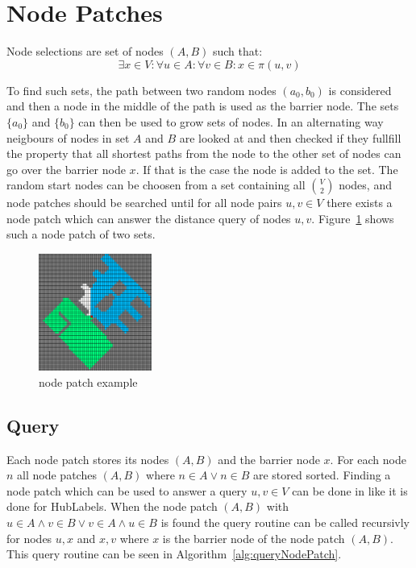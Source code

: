\documentclass{article}
\begin{document}
\section{Node Patches}
Node selections are set of nodes $(A, B)$ such that:
\begin{equation*}
  \exists x \in V: \forall u \in A: \forall v \in B: x \in \pi(u, v)
\end{equation*}

To find such sets, the path between two random nodes $(a_0, b_0)$ is considered and then a node in the middle of the path is used as the barrier node.
The sets $\{a_0\}$ and $\{b_0\}$ can then be used to grow sets of nodes. In an alternating way neigbours of nodes in set $A$ and $B$ are looked at and then
checked if they fullfill the property that all shortest paths from the node to the other set of nodes can go over the barrier node $x$.
If that is the case the node is added to the set. The random start nodes can be choosen from a set containing all $\binom{V}{2}$ nodes, and node patches should be searched until for all node pairs $u, v \in V$ there exists a node patch which can answer the distance query of nodes $u, v$.
Figure~\ref{pic:NodePatch} shows such a node patch of two sets.

\begin{figure}[ht!]
  \centering
  \includegraphics[width=0.33\textwidth]{NodePatch.png}
  \caption{node patch example}
  \label{pic:NodePatch}
\end{figure}

\subsection{Query}
Each node patch stores its nodes $(A, B)$ and the barrier node $x$.
For each node $n$ all node patches $(A, B)$ where $n \in A \lor n \in B$ are stored sorted.
Finding a node patch which can be used to answer a query $u, v \in V$ can be done in like it is done for HubLabels.
When the node patch $(A, B)$ with ${u \in A \land v \in B \lor v \in A \land u \in B}$ is found the query routine can be called
recursivly for nodes $u, x$ and $x, v$ where $x$ is the barrier node of the node patch $(A, B)$. This query routine can be seen in Algorithm~\ref{alg:queryNodePatch}.
\end{document}
